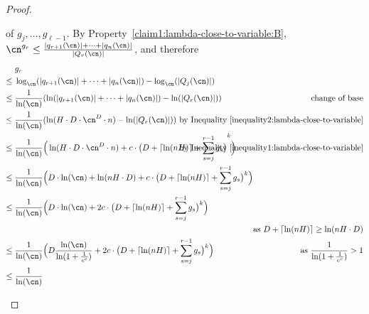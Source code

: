\begin{proof}
\begin{claimproof}
        of $g_j,\dots,g_{\ell-1}$. 
        By Property~\ref{claim1:lambda-close-to-variable:B}, 
        $\cn^{g_r} \leq
          \frac{\abs{q_{r+1}(\cn)}+\cdots+\abs{q_n(\cn)}}{\abs{Q_r(\cn)}}$, 
        and therefore
        \begin{align*}
          & g_r\\
          \leq{}& 
            \log_{\cn}(\abs{q_{r+1}(\cn)}+\cdots+\abs{q_n(\cn)})
            - \log_{\cn}(\abs{Q_j(\cn)})
          \\
          \leq{}& \frac{1}{\ln(\cn)} 
            (\ln(\abs{q_{r+1}(\cn)}+\cdots+\abs{q_n(\cn)})
            - \ln(\abs{Q_r(\cn)}))
          & 
          \hspace{-3.5cm}
          \text{change of base}
          \\
          \leq{}& \frac{1}{\ln(\cn)} 
            (\ln(H \cdot D \cdot \cn^{D} \cdot n) 
            - \ln(\abs{Q_r(\cn)}))
          &
          \hspace{-3.5cm}
          \text{by Inequality~\eqref{inequality2:lambda-close-to-variable}}
          \\
          \leq{}& \frac{1}{\ln(\cn)}  
            \Big(\ln( H \cdot D \cdot \cn^{D} \cdot n) 
            + c \cdot {\big(D + \ceil{\ln(n H)} 
            + \sum_{s=j}^{r-1} g_s \big)}^k \Big)
          &
          \hspace{-3.5cm}
          \text{by~Inequality~\eqref{inequality1:lambda-close-to-variable}}
          \\
          \leq{}& \frac{1}{\ln(\cn)} 
            \Big( D \cdot \ln(\cn) 
            + \ln(nH \cdot D)
            + c \cdot \big(D + \ceil{\ln(n H)} 
            + \sum_{s=j}^{r-1} g_s \big)^k \Big)\\
          \leq{}& \frac{1}{\ln(\cn)} 
            \Big(D \cdot \ln(\cn) 
            + 2c \cdot \big(D + \ceil{\ln(n H)} 
            + \sum_{s=j}^{r-1} g_s \big)^k \Big)\\
          &&
          \hspace{-3.5cm}
          \text{as $D + \ceil{\ln(nH)} \geq \ln(nH \cdot D)$}    
          \\
          \leq{}& \frac{1}{\ln(\cn)}  
            \Big(D \frac{\ln(\cn)}{\ln(1 + \frac{1}{e^c})} 
            + 2 c \cdot \big(D + \ceil{\ln(n H)} 
            + \sum_{s=j}^{r-1} g_s \big)^k \Big)
          &
          \hspace{-3.5cm}
          \text{as $\frac{1}{\ln(1+\frac{1}{e^c})} > 1$}\\
          \leq{}& \frac{1}{\ln(\cn)}  

\end{align*}
\end{claimproof}
\end{proof}
